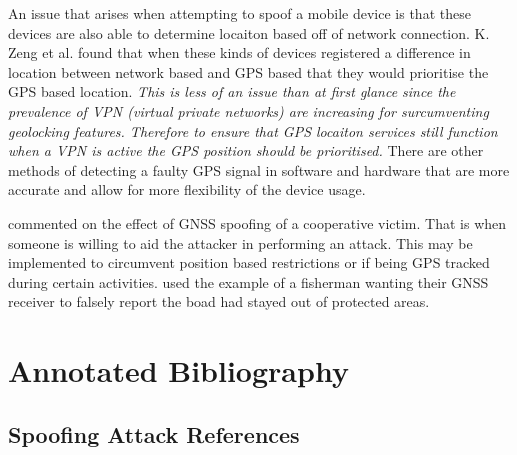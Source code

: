 \medskip

An issue that arises when attempting to spoof a mobile device is that these devices are also able to determine locaiton based off of
network connection. 
K. Zeng et al. \cite{RN9} found that when these kinds of devices registered a difference in location between network based and GPS based
that they would prioritise the GPS based location. \emph{This is less of an issue than at first glance since the prevalence of VPN (virtual private networks)
are increasing for surcumventing geolocking features. Therefore to ensure that GPS locaiton services still function when a VPN is active
the GPS position should be prioritised.} There are other methods of detecting a faulty GPS signal in software and hardware that are
more accurate and allow for more flexibility of the device usage. 

\bigskip

\citeauthor{RN12} \cite{RN12} commented on the effect of GNSS spoofing of a cooperative victim. That is when someone is willing to aid the attacker
in performing an attack. This may be implemented to circumvent position based restrictions or if being GPS tracked during certain activities.
\citeauthor{RN12} used the example of a fisherman wanting their GNSS receiver to falsely report the boad had stayed out of protected areas. 

\bigskip

\section{Annotated Bibliography}
\subsection{Spoofing Attack References}

